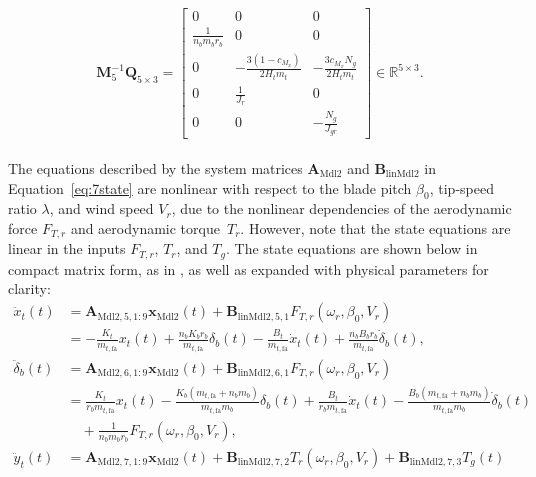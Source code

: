     \[
    \mathbf{M}_5^{-1}\mathbf{Q}_{5 \times 3} = \begin{bmatrix}
        0 & 0 & 0\\
        \frac{1}{n_b m_b r_b} & 0 & 0 \\
        0 & -\frac{3(1-c_{M_x})}{2 H_t m_t} & -\frac{3 c_{M_x} N_g}{2 H_t m_t}\\
        0 & \frac{1}{J_r} & 0\\
        0 & 0 & -\frac{N_{g}}{J_{gr}}
    \end{bmatrix} \in \mathbb{R}^{5 \times 3}.
    \]
    \\
    \noindent
    {
        The equations described by the system matrices \(\bm{A}_{\text{Mdl2}}\) and \(\bm{B}_{\text{linMdl2}}\) in Equation~\eqref{eq:7state} are nonlinear with respect to the blade pitch \(\beta_0\), tip-speed ratio \(\lambda\), and wind speed \(V_r\), due to the nonlinear dependencies of the aerodynamic force \(F_{T,r}\) and aerodynamic torque~\(T_r\). However, note that the state equations are linear in the inputs $F_{T,r}$, $T_r$, and $T_g$. The state equations are shown below in compact matrix form, as in \cite{dittmer2021velocity}, as well as expanded with physical parameters for clarity:
        \begin{align*}
            \ddot{x}_t(t) &= \bm{A}_{\text{Mdl2}, 5, 1:9} \bm{x}_{\text{Mdl2}}(t) + \bm{B}_{\text{linMdl2}, 5, 1} F_{T,r}(\omega_r, \beta_0, V_r) \\
            &= -\frac{K_t}{m_{t,\text{fa}}} x_t(t) + \frac{n_b K_b r_b}{m_{t,\text{fa}}} \delta_b(t)
            - \frac{B_t}{m_{t,\text{fa}}} \dot{x}_t(t) + \frac{n_b B_b r_b}{m_{t,\text{fa}}} \dot{\delta}_b(t), \\[1ex]
            \ddot{\delta}_b(t) &= \bm{A}_{\text{Mdl2}, 6, 1:9} \bm{x}_{\text{Mdl2}}(t) + \bm{B}_{\text{linMdl2}, 6, 1} F_{T,r}(\omega_r, \beta_0, V_r) \\
            &= \frac{K_t}{r_b m_{t,\text{fa}}} x_t(t) - \frac{K_b(m_{t,\text{fa}} + n_b m_b)}{m_{t,\text{fa}} m_b} \delta_b(t)
            + \frac{B_t}{r_b m_{t,\text{fa}}} \dot{x}_t(t) - \frac{B_b(m_{t,\text{fa}} + n_b m_b)}{m_{t,\text{fa}} m_b} \dot{\delta}_b(t) \\
            &\quad + \frac{1}{n_b m_b r_b} F_{T,r}(\omega_r, \beta_0, V_r), \\[1ex]
            \ddot{y}_t(t) &= \bm{A}_{\text{Mdl2}, 7, 1:9} \bm{x}_{\text{Mdl2}}(t)
            + \bm{B}_{\text{linMdl2}, 7, 2} T_r(\omega_r, \beta_0, V_r)
            + \bm{B}_{\text{linMdl2}, 7, 3} T_g(t) \\

\end{align*}}
